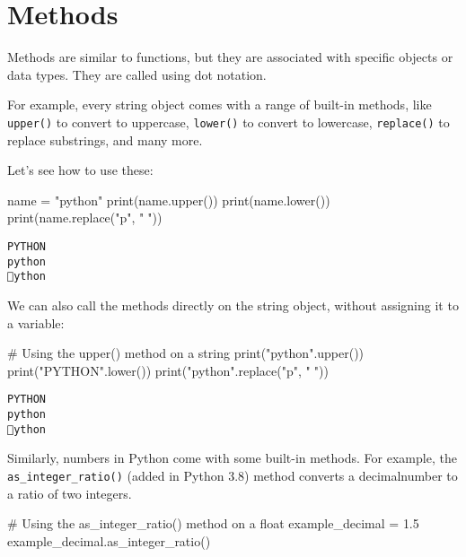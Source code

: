\documentclass[
  letterpaper,
  DIV=11,
  numbers=noendperiod]{scrreprt}
\newenvironment{Shaded}{\begin{snugshade}}{\end{snugshade}}
\newcommand{\BuiltInTok}[1]{\textcolor[rgb]{0.00,0.23,0.31}{#1}}
\newcommand{\CommentTok}[1]{\textcolor[rgb]{0.37,0.37,0.37}{#1}}
\newcommand{\FloatTok}[1]{\textcolor[rgb]{0.68,0.00,0.00}{#1}}
\newcommand{\NormalTok}[1]{\textcolor[rgb]{0.00,0.23,0.31}{#1}}
\newcommand{\OperatorTok}[1]{\textcolor[rgb]{0.37,0.37,0.37}{#1}}
\newcommand{\StringTok}[1]{\textcolor[rgb]{0.13,0.47,0.30}{#1}}
\begin{document}
\section{Methods}\label{methods}

Methods are similar to functions, but they are associated with specific
objects or data types. They are called using dot notation.

For example, every string object comes with a range of built-in methods,
like \texttt{upper()} to convert to uppercase, \texttt{lower()} to
convert to lowercase, \texttt{replace()} to replace substrings, and many
more.

Let's see how to use these:

\begin{Shaded}
\begin{Highlighting}[]
\NormalTok{name }\OperatorTok{=} \StringTok{"python"}
\BuiltInTok{print}\NormalTok{(name.upper())}
\BuiltInTok{print}\NormalTok{(name.lower())}
\BuiltInTok{print}\NormalTok{(name.replace(}\StringTok{"p"}\NormalTok{, }\StringTok{"🐍"}\NormalTok{))}
\end{Highlighting}
\end{Shaded}

\begin{verbatim}
PYTHON
python
🐍ython
\end{verbatim}

We can also call the methods directly on the string object, without
assigning it to a variable:

\begin{Shaded}
\begin{Highlighting}[]
\CommentTok{\# Using the upper() method on a string}
\BuiltInTok{print}\NormalTok{(}\StringTok{"python"}\NormalTok{.upper())}
\BuiltInTok{print}\NormalTok{(}\StringTok{"PYTHON"}\NormalTok{.lower())}
\BuiltInTok{print}\NormalTok{(}\StringTok{"python"}\NormalTok{.replace(}\StringTok{"p"}\NormalTok{, }\StringTok{"🐍"}\NormalTok{))}
\end{Highlighting}
\end{Shaded}

\begin{verbatim}
PYTHON
python
🐍ython
\end{verbatim}

Similarly, numbers in Python come with some built-in methods. For
example, the \texttt{as\_integer\_ratio()} (added in Python 3.8) method
converts a decimalnumber to a ratio of two integers.

\begin{Shaded}
\begin{Highlighting}[]
\CommentTok{\# Using the as\_integer\_ratio() method on a float}
\NormalTok{example\_decimal }\OperatorTok{=} \FloatTok{1.5}
\NormalTok{example\_decimal.as\_integer\_ratio()}
\end{Highlighting}
\end{Shaded}
\end{document}
